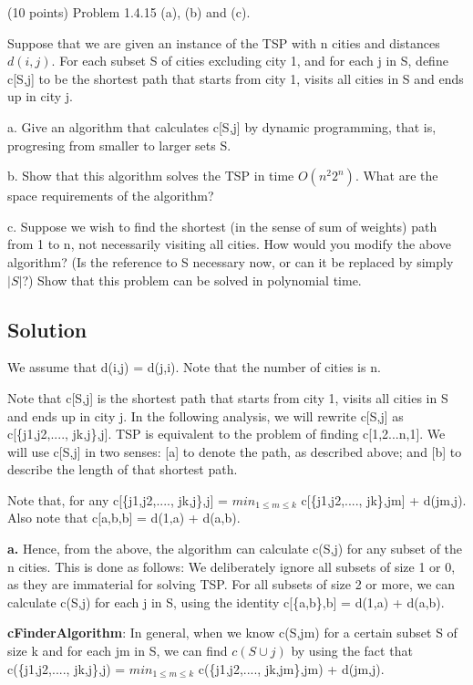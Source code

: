 \documentclass[10pt]{article}
\begin{document}
(10 points) Problem 1.4.15 (a), (b) and (c).

Suppose that we are given an instance of the TSP with n cities and distances $d(i,j)$. For each subset S of cities excluding city 1, and for each j in S, define c[S,j] to be the shortest path that starts from city 1, visits all cities in S and ends up in city j.

a. Give an algorithm that calculates c[S,j] by dynamic programming, that is, progresing from smaller to larger sets S.

b. Show that this algorithm solves the TSP in time $O(n^{2}2^{n})$. What are the space requirements of the algorithm?

c. Suppose we wish to find the shortest (in the sense of sum of weights) path from 1 to n, not necessarily visiting all cities. How would you modify the above algorithm? (Is the reference to S necessary now, or can it be replaced by simply $|S|$?) Show that this problem can be solved in polynomial time.

\subsection{Solution}

We assume that d(i,j) = d(j,i). Note that the number of cities is n.

Note that c[S,j] is the shortest path that starts from city 1, visits all cities in S and ends up in city j. In the following analysis, we will rewrite c[S,j] as c[\{j1,j2,...., jk,j\},j]. TSP is equivalent to the problem of finding c[{1,2...n},1]. We will use c[S,j] in two senses: [a] to denote the path, as described above; and [b] to describe the length of that shortest path.

Note that, for any c[\{j1,j2,...., jk,j\},j] = $min_{1 \leq m \leq k}$  c[\{j1,j2,...., jk\},jm] + d(jm,j). Also note that c[{a,b},b] = d(1,a) + d(a,b).

\textbf{a.} Hence, from the above, the algorithm can calculate c(S,j) for any subset of the n cities. This is done as follows: We deliberately ignore all subsets of size 1 or 0, as they are immaterial for solving TSP. For all subsets of size 2 or more, we can calculate c(S,j) for each j in S, using the identity c[\{a,b\},b] = d(1,a) + d(a,b).

\textbf{cFinderAlgorithm}: In general, when we know c(S,jm) for a certain subset S of size k and for each jm in S, we can find $c(S\cup {j})$ by using the fact that c(\{j1,j2,...., jk,j\},j) = $min_{1 \leq m \leq k}$  c(\{j1,j2,...., jk,jm\},jm) + d(jm,j).
\end{document}
